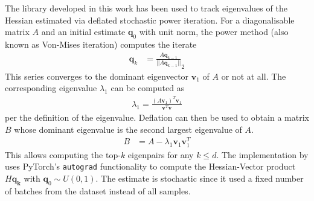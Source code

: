 The library developed in this work has been used to track eigenvalues of the
Hessian estimated via deflated stochastic power iteration. For a diagonalisable
matrix $A$ and an initial estimate $\mathbf{q}_0$ with unit norm, the power method
(also known as Von-Mises iteration) computes the iterate
\begin{align}
    \mathbf{q}_k &= \frac{A\mathbf{q}_{k-1}}{||A\mathbf{q}_{k-1}||}_2
\end{align}
This series converges to the dominant eigenvector $\mathbf{v}_1$ of $A$ or not at all.
The corresponding eigenvalue $\lambda_1$ can be computed as
\begin{align}
    \lambda_1 = \frac{\left(A\mathbf{v}_1\right)^T\mathbf{v}_1}{\mathbf{v}^T\mathbf{v}}
\end{align}
per the definition of the eigenvalue. Deflation can then be used to obtain a
matrix $B$ whose dominant eigenvalue is the second largest eigenvalue of $A$.
\begin{align}
    B &= A - \lambda_1 \mathbf{v}_1\mathbf{v}_1^T
\end{align}
This allows computing the top-$k$ eigenpairs for any $k \le d$. The implementation by
\citet{golmant2018} uses PyTorch's \texttt{autograd} functionality to compute
the Hessian-Vector product $H\mathbf{q_k}$ with $\mathbf{q}_0 \sim U(0,1)$. The
estimate is stochastic since it used a fixed number of batches from the dataset
instead of all samples.

